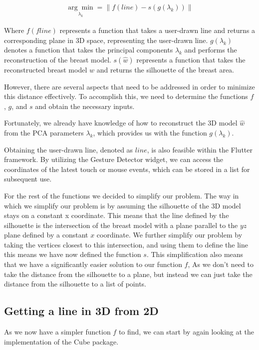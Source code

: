 \begin{align}\label{argmin:full}
    \underset{\lambda_k}{\arg\min} = \lVert f(line) - s(g(\lambda_k)) \rVert
\end{align}

Where $f(f{line})$ represents a function that takes a user-drawn line and returns a corresponding plane in 3D space, representing the user-drawn line. $g(\lambda_k)$ denotes a function 
that takes the principal components $\lambda_k$ and performs the reconstruction of the breast model. $s(\hat{w})$ represents a function that takes the reconstructed breast model $\hat{w}$ 
and returns the silhouette of the breast area.

However, there are several aspects that need to be addressed in order to minimize this distance effectively. To accomplish this, we need to determine the functions $f$, $g$, and $s$ and 
obtain the necessary inputs.

Fortunately, we already have knowledge of how to reconstruct the 3D model $\hat{w}$ from the PCA parameters $\lambda_k$, which provides us with the function $g(\lambda_k)$.

Obtaining the user-drawn line, denoted as $line$, is also feasible within the Flutter framework. By utilizing the Gesture Detector widget, we can access the coordinates of the latest 
touch or mouse events, which can be stored in a list for subsequent use.

For the rest of the functions we decided to simplify our problem. The way in which we simplify our problem is by assuming the silhouette of the 3D model stays on a constant x coordinate. This means
that the line defined by the silhouette is the intersection of the breast model with a plane parallel to the $yz$ plane defined by a constant $x$ coordinate. We further simplify our problem by 
taking the vertices closest to this intersection, and using them to define the line this means we have now defined the function $s$. This simplification also means that we have a significantly
easier solution to our function $f$, As we don't need to take the distance from the silhouette to a plane, but instead we can just take the distance from the silhouette to a list of points.

\subsection{Getting a line in 3D from 2D}

As we now have a simpler function $f$ to find, we can start by again looking at the implementation of the Cube package. 

